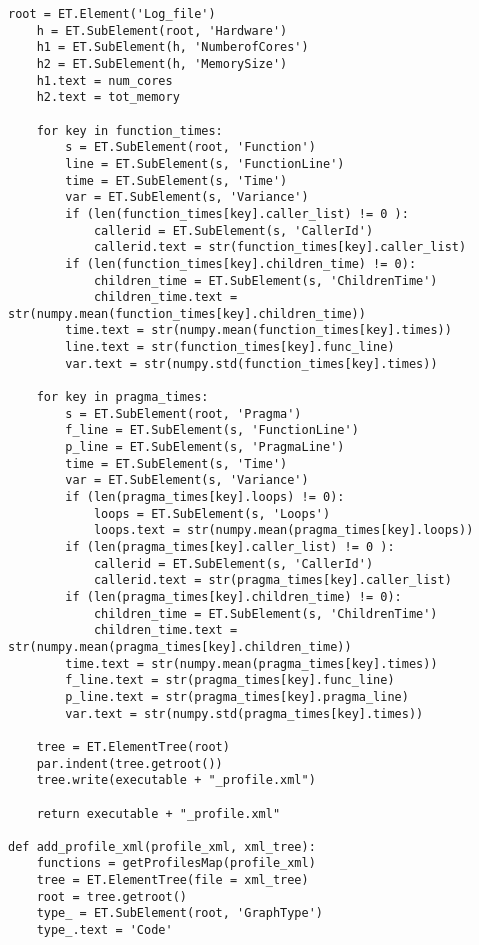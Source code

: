 \documentclass[a4paper,11pt,twoside]{book}
\begin{document}
\begin{lstlisting}[language=CCC, caption=profiler.py]
	root = ET.Element('Log_file')
	h = ET.SubElement(root, 'Hardware')
	h1 = ET.SubElement(h, 'NumberofCores')
	h2 = ET.SubElement(h, 'MemorySize')
	h1.text = num_cores
	h2.text = tot_memory

	for key in function_times:
		s = ET.SubElement(root, 'Function')
		line = ET.SubElement(s, 'FunctionLine')
		time = ET.SubElement(s, 'Time')
		var = ET.SubElement(s, 'Variance')
		if (len(function_times[key].caller_list) != 0 ):
			callerid = ET.SubElement(s, 'CallerId')
			callerid.text = str(function_times[key].caller_list)
		if (len(function_times[key].children_time) != 0):
			children_time = ET.SubElement(s, 'ChildrenTime')
			children_time.text = str(numpy.mean(function_times[key].children_time))
		time.text = str(numpy.mean(function_times[key].times))
		line.text = str(function_times[key].func_line)
		var.text = str(numpy.std(function_times[key].times))

	for key in pragma_times:
		s = ET.SubElement(root, 'Pragma')
		f_line = ET.SubElement(s, 'FunctionLine')
		p_line = ET.SubElement(s, 'PragmaLine')
		time = ET.SubElement(s, 'Time')
		var = ET.SubElement(s, 'Variance')
		if (len(pragma_times[key].loops) != 0):
			loops = ET.SubElement(s, 'Loops')
			loops.text = str(numpy.mean(pragma_times[key].loops))
		if (len(pragma_times[key].caller_list) != 0 ):
			callerid = ET.SubElement(s, 'CallerId')
			callerid.text = str(pragma_times[key].caller_list)
		if (len(pragma_times[key].children_time) != 0):
			children_time = ET.SubElement(s, 'ChildrenTime')
			children_time.text = str(numpy.mean(pragma_times[key].children_time))
		time.text = str(numpy.mean(pragma_times[key].times))
		f_line.text = str(pragma_times[key].func_line)
		p_line.text = str(pragma_times[key].pragma_line)
		var.text = str(numpy.std(pragma_times[key].times))

	tree = ET.ElementTree(root)
	par.indent(tree.getroot())
	tree.write(executable + "_profile.xml")

	return executable + "_profile.xml"

def add_profile_xml(profile_xml, xml_tree):
	functions = getProfilesMap(profile_xml)
	tree = ET.ElementTree(file = xml_tree) 
	root = tree.getroot()
	type_ = ET.SubElement(root, 'GraphType')
	type_.text = 'Code'


\end{lstlisting}
\end{document}
